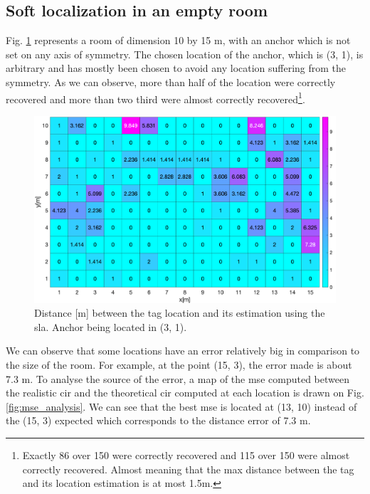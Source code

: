 \subsection{Soft localization in an empty room}
\label{soft_empty_room}
Fig. \ref{fig:pos_ant_empty_non_sym} represents a room of dimension 10 by 15 m, with an anchor which is not set on any axis of symmetry. The chosen location of the anchor, which is (3, 1), is arbitrary and has mostly been chosen to avoid any location suffering from the symmetry. As we can observe, more than half of the location were correctly recovered and more than two third were almost correctly recovered\footnote{Exactly 86 over 150 were correctly recovered and 115 over 150 were almost correctly recovered. Almost meaning that the max distance between the tag and its location estimation is at most 1.5m.}.

\begin{figure}[H]
\centering
\includegraphics[width=\linewidth]{Images/no_more_name_idea.png}
\caption{Distance [m] between the tag location and its estimation using the \gls{sla}. Anchor being located in (3, 1). \label{fig:pos_ant_empty_non_sym}}
\end{figure}

We can observe that some locations have an error relatively big in comparison to the size of the room. For example, at the point (15, 3), the error made is about 7.3 m. To analyse the source of the error, a map of the \gls{mse} computed between the realistic \gls{cir} and the theoretical \gls{cir} computed at each location is drawn on Fig. \ref{fig:mse_analysis}. We can see that the best \gls{mse} is located at (13, 10) instead of the (15, 3) expected which corresponds to the distance error of 7.3 m.

